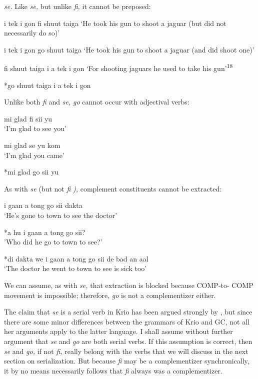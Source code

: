 \textit{se.} Like \textit{se,} but unlike \textit{fi,} it cannot be preposed:

\ea\label{ex:2:210}
 i tek i gon fi shuut taiga
\glt `He took his gun to shoot a jaguar (but did not necessarily do so)'
\z



\ea\label{ex:2:211}
 i tek i gon go shuut taiga
\glt `He took his gun to shoot a jaguar (and did shoot one)'
\z



\ea\label{ex:2:212}
 fi shuut taiga i a tek i gon
\glt `For shooting jaguars he used to take his gun'\textsuperscript{18}
\z



\ea\label{ex:2:213}
 *go shuut taiga i a tek i gon
\z

Unlike both \textit{fi} and \textit{se,} \textit{go} cannot occur with adjectival verbs:

\ea\label{ex:2:214}
 mi glad fi sii yu\\
\glt `I'm glad to see you'
\z



\ea\label{ex:2:215}
 mi glad se yu kom \\
\glt `I'm glad you came'
\z

\ea\label{ex:2:216}
 *mi glad go sii yu
\z

As with \textit{se} (but not \textit{fi} \textit{),} complement constituents cannot be extracted:


\ea\label{ex:2:217}
 i gaan a tong go sii dakta\\
\glt `He's gone to town to see the doctor'
\z

\ea\label{ex:2:218}
 *a hu i gaan a tong go sii?\\
\glt  'Who did he go to town to see?'
\z



\ea\label{ex:2:219}
 *di dakta we i gaan a tong go sii de bad an aal \\
\glt `The doctor he went to town to see is sick too'
\z

We can assume, as with \textit{se,} that extraction is blocked because COMP-to-%
COMP movement is impossible; therefore, \textit{go} is not a complementizer either.

The claim that \textit{se }is a serial verb in Krio has been argued strongly
by \citet{Larimore1976}, but since there are some minor differences between the grammars of Krio and GC, not all her arguments apply to the latter language. I shall assume without further argument that \textit{se} and \textit{go} are both serial verbs. If this assumption is correct, then \textit{se} and \textit{go,} if not \textit{fi,} really belong with the verbs that we will discuss in the next section on serialization. But because \textit{fi} may be a comple\-mentizer synchronically, it by no means necessarily follows that \textit{fi} always was a complementizer.

